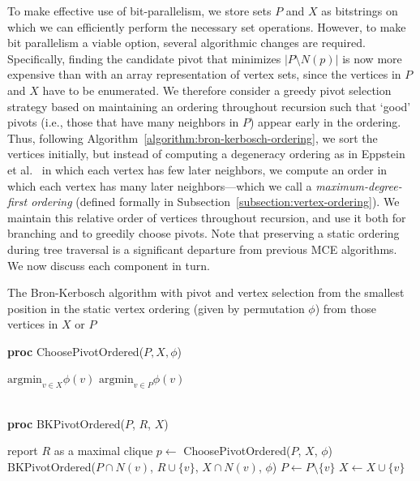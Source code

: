 \documentclass[final,1p]{elsarticle-modified}
\newcommand{\argmin}{\ensuremath{\mathrm{argmin}}}
\begin{document}
To make effective use of bit-parallelism, we store sets $P$ and $X$ as bitstrings on which we can efficiently perform the necessary set operations. However, to make bit parallelism a viable option, several algorithmic changes are required. Specifically, finding the candidate pivot that minimizes $|P\setminus N(p)|$ is now more expensive than with an array representation of vertex sets, since the vertices in $P$ and $X$ have to be enumerated. We therefore consider a greedy pivot selection strategy based on maintaining an ordering throughout recursion such that `good' pivots (i.e., those that have many neighbors in $P$) appear early in the ordering. Thus, following Algorithm~\ref{algorithm:bron-kerbosch-ordering}, we sort the vertices initially, but instead of computing a degeneracy ordering as in Eppstein et al.~\cite{els-2013} in which each vertex has few later neighbors, we compute an order in which each vertex has many later neighbors---which we call a \emph{maximum-degree-first ordering} (defined formally in Subsection~\ref{subsection:vertex-ordering}). We maintain this relative order of vertices throughout recursion, and use it both for branching and to greedily choose pivots. Note that preserving a static ordering during tree traversal is a significant departure from previous MCE algorithms. We now discuss each component in turn.

\begin{algorithm}[!htb]
\caption{The Bron-Kerbosch algorithm with pivot and vertex selection from the smallest position in the static vertex ordering (given by permutation $\phi$) from those vertices in $X$ or $P$}
\label{algorithm:bron-kerbosch-static-ordering}
{\bf proc} ChoosePivotOrdered($P,X,\phi$)
\begin{algorithmic}[1]
    \State \Return $\argmin_{v\in X}\phi(v)$
\Else
    \State \Return $\argmin_{v\in P}\phi(v)$
\EndIf
{}
\end{algorithmic}
\quad\\
{\bf proc} BKPivotOrdered($P$, $R$, $X$)
\begin{algorithmic}[1]
{}
    \State report $R$ as a maximal clique
\EndIf
\State $p \leftarrow $ ChoosePivotOrdered($P$, $X$, $\phi$)
\For{ $v = \argmin_{w\in P\setminus N(p)} \phi(w)$}
    \State BKPivotOrdered($P\cap N(v)$, $R\cup\{v\}$, $X\cap N(v)$, $\phi$)
    \State $P \leftarrow P \setminus \{v\}$
    \State $X \leftarrow X \cup \{v\}$
\EndFor
\end{algorithmic}
\end{algorithm}
\end{document}
